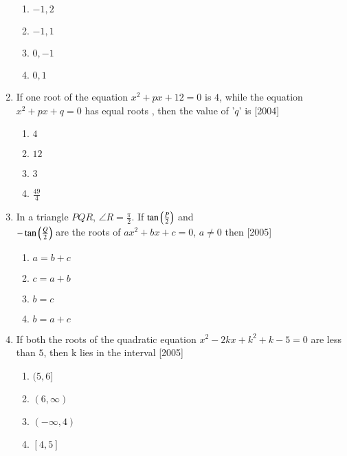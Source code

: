 \documentclass[journal,12pt,twocolumn]{IEEEtran}
\theoremstyle{remark}
\begin{document}
\begin{enumerate}
\begin{enumerate}

	\item  $-1,2$
	\item  $-1,1$
	\item  $0,-1$
	\item  $0,1$

\end{enumerate}

\item If one root of the equation $x^2 + px + 12 = 0$ is $4$, while the equation  $x^2 + px + q = 0$ has equal roots , then the value of '$q$' is
\hfill[2004]

\begin{enumerate}

	\item  $4$
	\item  $12$
	\item  $3$
	\item  $\frac{49}{4}$

\end{enumerate}

\item In a triangle $PQR$, $\angle R = \frac{\pi}{2}$. If $ \tan\left(\frac{P}{2}\right)$ and \\
	$- \tan\left(\frac{Q}{2}\right)$ are the roots of $ax^2 + bx + c = 0$, $a \neq 0$ then
\hfill[2005]

\begin{enumerate}


	\item  $a = b + c$
	\item  $c = a + b$
	\item  $b = c$
	\item  $b = a + c$

\end{enumerate}

\item If both the roots of the quadratic equation  $x^2 - 2kx + k^2 + k - 5 = 0$ are less than $5$, then k lies in the interval
\hfill[2005]

\begin{enumerate}

	\item  $(5,6]$
	\item  $(6,\infty)$
	\item  $(- \infty,4)$
	\item  $[4,5]$

\end{enumerate}


\end{enumerate}
\end{document}
